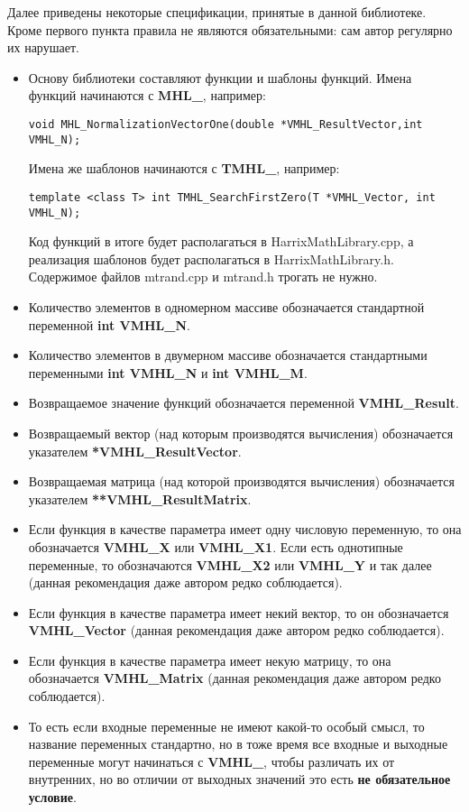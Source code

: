 Далее приведены некоторые спецификации, принятые в данной библиотеке. Кроме первого пункта правила не являются обязательными: сам автор регулярно их нарушает.
\begin{itemize}
\item Основу библиотеки составляют функции и шаблоны функций. Имена функций начинаются с \textbf{MHL\_}, например:
\begin{lstlisting}[label=examplename,caption=Пример названия функции]
void MHL_NormalizationVectorOne(double *VMHL_ResultVector,int VMHL_N);
\end{lstlisting}
Имена же шаблонов начинаются с \textbf{TMHL\_}, например:
\begin{lstlisting}[label=examplename2,caption=Пример названия шаблона функции]
template <class T> int TMHL_SearchFirstZero(T *VMHL_Vector, int VMHL_N);
\end{lstlisting}
Код функций в итоге будет располагаться в HarrixMathLibrary.cpp, а реализация шаблонов будет располагаться в HarrixMathLibrary.h. Содержимое файлов mtrand.cpp и mtrand.h трогать не нужно.
\item Количество элементов в одномерном массиве обозначается стандартной переменной  \textbf{int VMHL\_N}.
\item Количество элементов в двумерном массиве обозначается стандартными переменными  \textbf{int VMHL\_N} и \textbf{int VMHL\_M}.
\item Возвращаемое значение функций обозначается переменной \textbf{VMHL\_Result}.
\item Возвращаемый вектор (над которым производятся вычисления) обозначается указателем \textbf{*VMHL\_ResultVector}.
\item Возвращаемая матрица (над которой производятся вычисления) обозначается указателем \textbf{**VMHL\_ResultMatrix}.
\item Если функция в качестве параметра имеет одну числовую переменную, то она обозначается \textbf{VMHL\_X} или \textbf{VMHL\_X1}. Если есть однотипные переменные, то обозначаются \textbf{VMHL\_X2} или \textbf{VMHL\_Y} и так далее (данная рекомендация даже автором редко соблюдается).
\item Если функция в качестве параметра имеет некий вектор, то он обозначается \textbf{VMHL\_Vector} (данная рекомендация даже автором редко соблюдается).
\item Если функция в качестве параметра имеет некую матрицу, то она обозначается \textbf{VMHL\_Matrix} (данная рекомендация даже автором редко соблюдается).
\item То есть если входные переменные не имеют какой-то особый смысл, то название переменных стандартно, но в тоже время все входные и выходные переменные могут начинаться с \textbf{VMHL\_}, чтобы различать их от внутренних, но во отличии от выходных значений это есть \textbf{не обязательное условие}.
\end{itemize}

